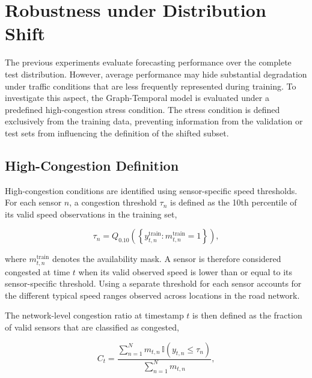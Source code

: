 \section{Robustness under Distribution Shift}
\label{sec:distribution_shift}

The previous experiments evaluate forecasting performance over the complete
test distribution. However, average performance may hide substantial
degradation under traffic conditions that are less frequently represented
during training. To investigate this aspect, the Graph-Temporal model is
evaluated under a predefined high-congestion stress condition. The stress
condition is defined exclusively from the training data, preventing
information from the validation or test sets from influencing the definition
of the shifted subset.

\subsection{High-Congestion Definition}
\label{subsec:congestion_definition}

High-congestion conditions are identified using sensor-specific speed
thresholds. For each sensor $n$, a congestion threshold $\tau_n$ is defined
as the 10th percentile of its valid speed observations in the training set,

\begin{equation}
    \tau_n =
    Q_{0.10}
    \left(
        \left\{y_{t,n}^{\mathrm{train}} :
        m_{t,n}^{\mathrm{train}} = 1\right\}
    \right),
    \label{eq:sensor_congestion_threshold}
\end{equation}

where $m_{t,n}^{\mathrm{train}}$ denotes the availability mask. A sensor is
therefore considered congested at time $t$ when its valid observed speed is
lower than or equal to its sensor-specific threshold. Using a separate
threshold for each sensor accounts for the different typical speed ranges
observed across locations in the road network.

The network-level congestion ratio at timestamp $t$ is then defined as the
fraction of valid sensors that are classified as congested,

\begin{equation}
    C_t =
    \frac{
        \sum_{n=1}^{N}
        m_{t,n}\,
        \mathbb{I}\!\left(y_{t,n} \leq \tau_n\right)
    }{
        \sum_{n=1}^{N} m_{t,n}
    },
    \label{eq:congestion_ratio}
\end{equation}

